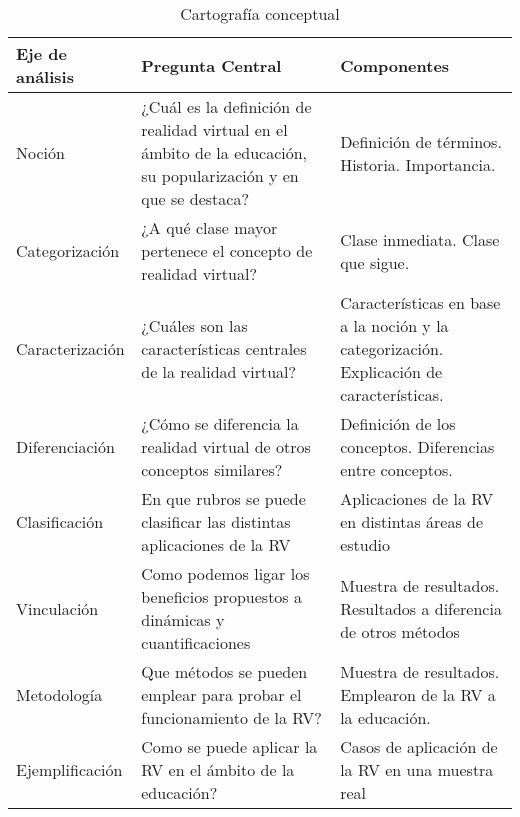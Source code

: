 \begin{table}[!h]
   \caption{Cartografía conceptual}
   \begin{tabularx}{\textwidth}{
         | >{\raggedright\arraybackslash}X 
  | >{\centering\arraybackslash}X 
  | >{\raggedleft\arraybackslash}X |
      }
      Eje de análisis & Pregunta Central & Componentes\\
      \hline
      Noción & ¿Cuál es la definición de realidad virtual en el ámbito de la educación, su popularización y en que se destaca? & Definición de términos. Historia. Importancia.\\
      Categorización & ¿A qué clase mayor pertenece el concepto de realidad virtual? & Clase inmediata. Clase que sigue.\\
      Caracterización & ¿Cuáles son las características centrales de la realidad virtual? & Características en base a la noción y la categorización. Explicación de características.\\
      Diferenciación & ¿Cómo se diferencia la realidad virtual de otros conceptos similares? & Definición de los conceptos. Diferencias entre conceptos.\\
      Clasificación & En que rubros se puede clasificar las distintas aplicaciones de la RV & Aplicaciones de la RV en distintas áreas de estudio\\
      Vinculación & Como podemos ligar los beneficios propuestos a dinámicas y cuantificaciones& Muestra de resultados. Resultados a diferencia de otros métodos\\
      Metodología & Que métodos se pueden emplear para probar el funcionamiento de la RV?& Muestra de resultados. Emplearon de la RV a la educación.\\
      Ejemplificación & Como se puede aplicar la RV en el ámbito de la educación? & Casos de aplicación de la RV en una muestra real\\
   \end{tabularx}
\end{table}

